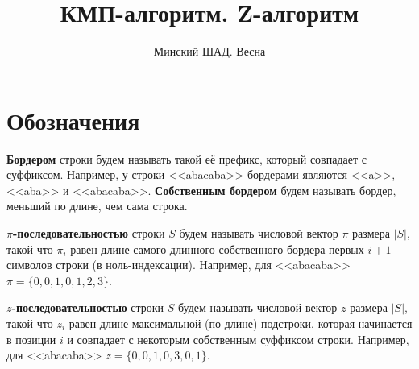 \documentclass[addpoints]{exam}
\title{КМП-алгоритм. Z-алгоритм}
\author{Минский ШАД. Весна}
\begin{document}
\printanswers
\maketitle

\section{Обозначения}

\textbf{Бордером} строки будем называть такой её префикс, который совпадает с суффиксом. Например, у строки <<abacaba>> бордерами являются <<a>>, <<aba>> и <<abacaba>>. \textbf{Собственным бордером} будем называть бордер, меньший по длине, чем сама строка. 

\label{piseq} \textbf{$\pi$-последовательностью} строки $S$ будем называть числовой вектор $\pi$ размера $|S|$, такой что $\pi_i$ равен длине самого длинного собственного бордера первых $i+1$ символов строки (в ноль-индексации). Например, для <<abacaba>> $\pi=\{0,0,1,0,1,2,3\}$. 

\label{zseq} \textbf{$z$-последовательностью} строки $S$ будем называть числовой вектор $z$ размера $|S|$, такой что $z_i$ равен длине максимальной (по длине) подстроки, которая начинается в позиции $i$ и совпадает с некоторым собственным суффиксом строки. Например, для <<abacaba>> $z=\{0,0,1,0,3,0,1\}$. 
\end{document}
